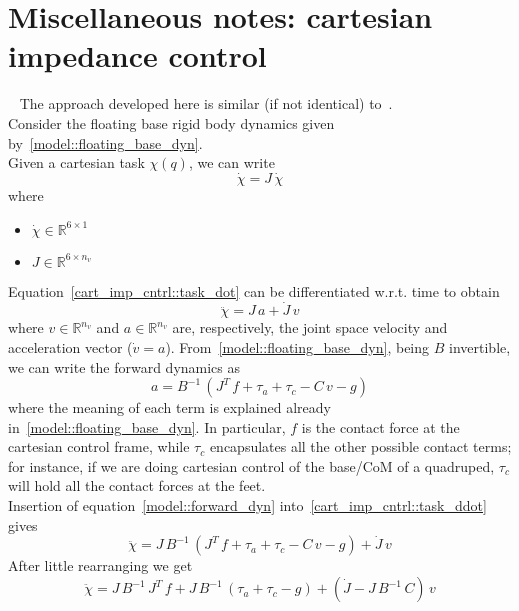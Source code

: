 \documentclass[letterpaper, 10 pt, conference]{ieeeconf}  %
\begin{document}
\section{Miscellaneous notes: cartesian impedance control}\label{section::cartesian_impedance_cntrl}
~\cite{cart_imp::hogan1984impedance}
The approach developed here is similar (if not identical) to~\cite{cart_imp::ficuciello2015variable}.\\
Consider the floating base rigid body dynamics given by~\eqref{model::floating_base_dyn}.\\
Given a cartesian task $\chi(q)$, we can write
\begin{equation}\label{cart_imp_cntrl::task_dot}
\dot{\chi} = J\,\dot{\chi}
\end{equation}
where
\begin{itemize}
	\item $\dot{\chi}\in\mathbb{R}^{6\times 1}$
	\item $J\in\mathbb{R}^{6\times n_v}$
\end{itemize}
Equation~\eqref{cart_imp_cntrl::task_dot} can be differentiated w.r.t. time to obtain
\begin{equation}\label{cart_imp_cntrl::task_ddot}
\ddot{\chi} = J\,a + \dot{J}\,v
\end{equation}
where $v\in\mathbb{R}^{n_v}$ and $a\in\mathbb{R}^{n_v}$ are, respectively, the joint space velocity and acceleration vector ($\dot{v} = a$).
From~\eqref{model::floating_base_dyn}, being $B$ invertible, we can write the forward dynamics as
\begin{equation}\label{model::forward_dyn}
a = B^{-1}\,\left(J^T\,f + \tau_a + \tau_c - C\,v - g\right)
\end{equation}
where the meaning of each term is explained already in~\eqref{model::floating_base_dyn}. In particular, $f$ is the contact force at the cartesian control frame, while $\tau_c$ encapsulates all the other possible contact terms; for instance, if we are doing cartesian control of the base/CoM of a quadruped, $\tau_c$ will hold all the contact forces at the feet.\\
Insertion of equation~\eqref{model::forward_dyn} into~\eqref{cart_imp_cntrl::task_ddot} gives
\begin{equation}\label{cart_imp_cntrl::task_dyn_raw}
\ddot{\chi} = J\,B^{-1}\,\left(J^T\,f + \tau_a + \tau_c - C\,v - g\right) + \dot{J}\,v
\end{equation}
After little rearranging we get
\begin{equation}\label{cart_imp_cntrl::task_forward_dyn}
\ddot{\chi} = J\,B^{-1}\,J^T\,f + J\,B^{-1}\,\left(\tau_a + \tau_c - g\right) +\left(\dot{J} - J\,B^{-1}\,C\right)\,v
\end{equation}
\end{document}
